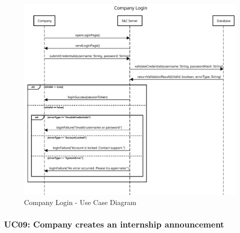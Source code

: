 \begin{figure}[H]
    \centering
    \includegraphics[width=1.0\textwidth]{Images/UC_8.pdf}
    \caption{Company Login - Use Case Diagram}
    \label{fig:use-case-diagram-8}
\end{figure}


\subsubsection{UC09: Company creates an internship announcement}
\label{subsubsec:company-creates-an-internship-announcement}


